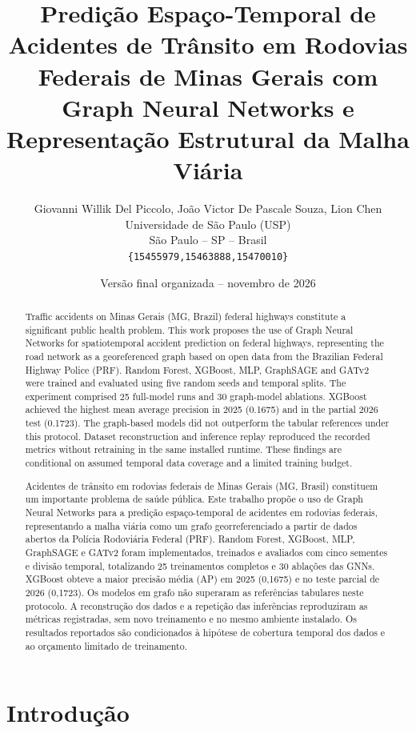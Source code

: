 \documentclass[12pt]{article}
\title{Predição Espaço-Temporal de Acidentes de Trânsito em Rodovias
Federais de Minas Gerais com Graph Neural Networks e Representação
Estrutural da Malha Viária}
\author{
Giovanni Willik Del Piccolo,
João Victor De Pascale Souza,
Lion Chen\\
Universidade de São Paulo (USP)\\
São Paulo -- SP -- Brasil\\
\texttt{\{15455979,15463888,15470010\}}
}
\date{Versão final organizada -- novembro de 2026}
\newenvironment{resumo}{%
  \renewcommand{\abstractname}{Resumo}\begin{abstract}%
}{\end{abstract}}
\begin{document}
\maketitle

\begin{abstract}
Traffic accidents on Minas Gerais (MG, Brazil) federal highways constitute a significant
public health problem. This work proposes the use of Graph Neural
Networks for spatiotemporal accident prediction
on federal highways, representing the road network as a georeferenced
graph based on open data from the Brazilian Federal Highway Police
(PRF). Random Forest, XGBoost, MLP, GraphSAGE and GATv2 were trained
and evaluated using five random seeds and temporal splits. The
experiment comprised 25 full-model runs and 30 graph-model ablations.
XGBoost achieved the highest mean average precision in 2025 (0.1675)
and in the partial 2026 test (0.1723). The graph-based models did not
outperform the tabular references under this protocol. Dataset
reconstruction and inference replay reproduced the recorded metrics
without retraining in the same installed runtime. These findings are
conditional on assumed temporal data coverage and a limited training
budget.
\end{abstract}

\begin{resumo}
Acidentes de trânsito em rodovias federais de Minas Gerais (MG, Brasil) constituem um
importante problema de saúde pública. Este trabalho propõe o uso de
Graph Neural Networks para a predição
espaço-temporal de acidentes em rodovias federais, representando a
malha viária como um grafo georreferenciado a partir de dados abertos
da Polícia Rodoviária Federal (PRF). Random Forest, XGBoost, MLP,
GraphSAGE e GATv2 foram implementados, treinados e avaliados com cinco
sementes e divisão temporal, totalizando 25 treinamentos completos e
30 ablações das GNNs. XGBoost obteve a maior precisão média (AP) em
2025 (0,1675) e no teste parcial de 2026 (0,1723). Os modelos em grafo
não superaram as referências tabulares neste protocolo. A
reconstrução dos dados e a repetição das inferências reproduziram as
métricas registradas, sem novo treinamento e no mesmo ambiente
instalado. Os resultados reportados são
condicionados à hipótese de cobertura temporal dos dados e ao
orçamento limitado de treinamento.
\end{resumo}

\section{Introdução}
\end{document}
